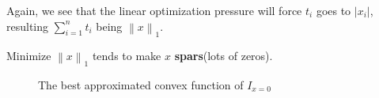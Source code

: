 Again, we see that the linear optimization pressure will force \(t_i\) goes to \(\left\vert x_i \right\vert \), resulting
\(\sum\limits_{i=1}^{n} t_i\) being \(\left\lVert x\right\rVert_1\).

\begin{remark}
	Minimize \(\left\lVert x\right\rVert_1\) tends to make \(x\) \textbf{spars}(lots of zeros).
	\begin{figure}[H]
		\centering
		\caption{The best approximated convex function of \(I_{x = 0}\) }
		\label{fig:1-norm}
	\end{figure}
\end{remark}
